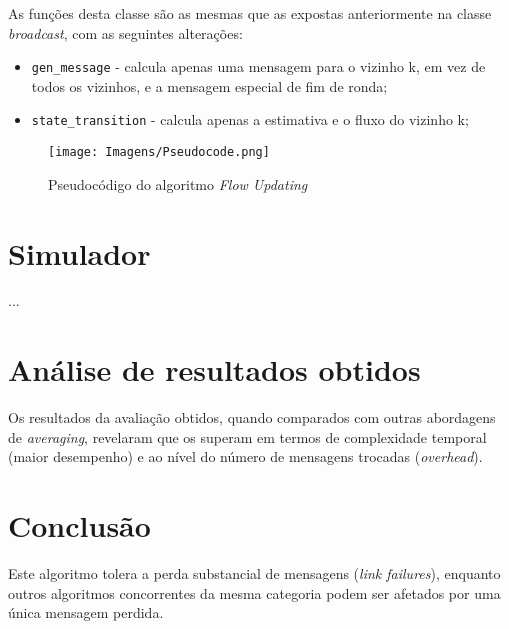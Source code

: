 \documentclass[a4paper]{article}
\begin{document}
{		As funções desta classe são as mesmas que as expostas anteriormente na classe \textit{broadcast}, com as seguintes alterações:
		\begin{itemize}
			\item \texttt{gen_message} - calcula apenas uma mensagem para o vizinho k, em vez de todos os vizinhos, e a mensagem especial de fim de ronda;
			\item \texttt{state_transition} - calcula apenas a estimativa e o fluxo do vizinho k;
		\end{itemize}

	\begin{figure}[H]
		\centering
		\texttt{[image: Imagens/Pseudocode.png]}
		\caption{Pseudocódigo do algoritmo \textit{Flow Updating}}
		\label{fig:1}
	\end{figure}
}

\section{Simulador} \label{sec:Simulator}
\large{
	...
}

\section{Análise de resultados obtidos} \label{sec:Analysis of results}
\large{
	Os resultados da avaliação obtidos, quando comparados com outras abordagens de \textit{averaging}, revelaram que os superam em termos de complexidade temporal (maior desempenho) e ao nível do número de mensagens trocadas (\textit{overhead}).
}

\section{Conclusão} \label{sec:Conclusion}
\large{
	Este algoritmo tolera a perda substancial de mensagens (\textit{link failures}), enquanto outros algoritmos concorrentes da mesma categoria podem ser afetados por uma única mensagem perdida.
}

\printbibliography[heading=bibintoc]
\end{document}
